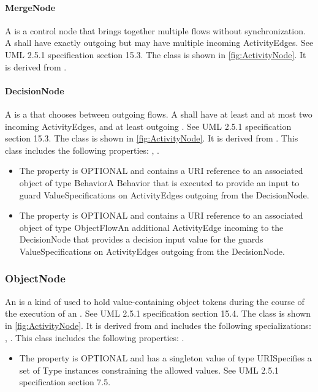 \paragraph{MergeNode}%
\label{sec:uml:MergeNode}%
A  is a control node that brings together multiple flows without synchronization. A  shall have exactly  outgoing  but may have multiple incoming ActivityEdges. See UML 2.5.1 specification section 15.3.%
\newline%
\linebreak%
The  class is shown in \ref{fig:ActivityNode}. It is derived from .%
%
\paragraph{DecisionNode}%
\label{sec:uml:DecisionNode}%
A  is a  that chooses between outgoing flows. A  shall have at least  and at most two incoming ActivityEdges, and at least  outgoing . See UML 2.5.1 specification section 15.3.%
\newline%
\linebreak%
The  class is shown in \ref{fig:ActivityNode}. It is derived from .%
This class includes the following properties: , . %
\begin{itemize}%
\item%
The  property is OPTIONAL and contains a URI reference to an associated object of type BehaviorA Behavior that is executed to provide an input to guard ValueSpecifications on ActivityEdges outgoing from the DecisionNode.%
\item%
The  property is OPTIONAL and contains a URI reference to an associated object of type ObjectFlowAn additional ActivityEdge incoming to the DecisionNode that provides a decision input value for the guards ValueSpecifications on ActivityEdges outgoing from the DecisionNode.%
\end{itemize}%
\subsubsection{ObjectNode}%
\label{sec:uml:ObjectNode}%
An  is a kind of  used to hold value-containing object tokens during the course of the execution of an . See UML 2.5.1 specification section 15.4.%
\newline%
\linebreak%
The  class is shown in \ref{fig:ActivityNode}. It is derived from  and includes the following specializations: , . %
This class includes the following properties: . %
\begin{itemize}%
\item%
The  property is OPTIONAL and has a singleton value of type URISpecifies a set of Type instances constraining the allowed values. See UML 2.5.1 specification section 7.5.%
\end{itemize}%
